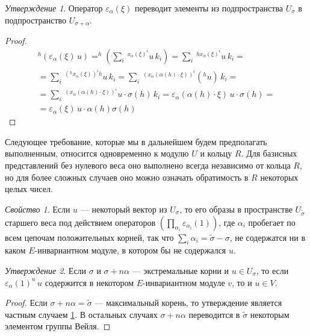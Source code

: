 \documentclass[10pt]{article}
\theoremstyle{remark}
\newtheorem{prop}{Утверждение}
\newtheorem{hyp}{Свойство}
\begin{document}
\begin{prop}
Оператор $\varepsilon_\alpha(\xi)$ переводит элементы из подпространства $U_\sigma$ в подпространство $U_{\sigma+\alpha}$.
\end{prop}
\begin{proof}
\begin{multline*}
^h(\varepsilon_\alpha(\xi) \, u) =
^h\left(\sum_i \, {^{x_\alpha(\xi)^i}u \, k_i}\right) = 
\sum_i \, {^{h x_\alpha(\xi)^i}u \, k_i} = \\ =
\sum_i \, {^{(^h x_\alpha(\xi))^i h}u \, k_i} = 
\sum_i \, {^{(x_\alpha(\alpha(h)\cdot\xi))^i} \left(^h u\right) \, k_i} =\\=
\sum_i \, {^{(x_\alpha(\alpha(h)\cdot\xi))^i} u \cdot \sigma(h) \, k_i} =
\varepsilon_\alpha(\alpha(h)\cdot\xi) \, u \cdot \sigma(h) = \\ =
\varepsilon_\alpha(\xi) \, u \cdot \alpha(h)\sigma(h)
\end{multline*}
\end{proof}

Следующее требование, которые мы в дальнейшем будем предполагать выполненным, относится одновременно к модулю $U$ и кольцу $R$. Для базисных представлений без нулевого веса оно выполнено всегда независимо от кольца $R$, но для более сложных случаев оно можно означать обратимость в $R$ некоторых целых чисел.

\begin{hyp}\label{returnfromhighest}
Если $u$ --- некоторый вектор из $U_\sigma$, то его образы в пространстве $U_{\widetilde\sigma}$ старшего веса под действием операторов 
$\left(\prod_{\alpha_i}\varepsilon_{\alpha_i}(1)\right)$, где $\alpha_i$ пробегает по всем цепочам положительных корней, так что $\sum_i \alpha_i = \widetilde\sigma - \sigma$, не содержатся ни в каком $E$-инвариантном модуле, в котором бы не содержался $u$.
\end{hyp}

\begin{prop} \label{extremalweightisomorphism}
Если $\sigma$ и $\sigma+n\alpha$ --- экстремальные корни и $u\in U_\sigma$, то
если $\varepsilon_\alpha(1)^n \, u $ содержится в некотором $E$-инвариантном модуле $v$, то и $u \in V$.
\end{prop}
\begin{proof}
Если $\sigma+n\alpha = \widetilde\sigma$ --- максимальный корень, то утверждение является частным случаем \ref{returnfromhighest}. В остальных случаях $\sigma+n\alpha$ переводится в $\widetilde\sigma$ некоторым элементом группы Вейля.
\end{proof}
\end{document}
